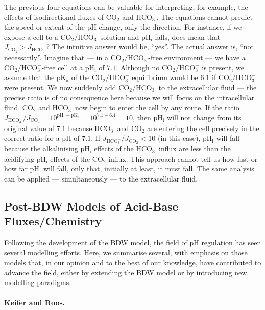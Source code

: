 \documentclass[fleqn,10pt]{physiome}
\begin{document}
The previous four equations can be valuable for interpreting, for example, the effects of isodirectional fluxes of $\mathrm{CO_2}$ and $\mathrm{HCO_3^-}$. The equations cannot predict the speed or extent of the $\mathrm{pH}$ change, only the direction. For instance, if we expose a cell to a $\mathrm{CO_2}/\mathrm{HCO_3^-}$ solution and $\mathrm{pH_i}$ falls, does mean that $J_\mathrm{CO_2}>J_\mathrm{HCO_3^-}$? The intuitive answer would be, ``yes''. The actual answer is, ``not necessarily''. Imagine that --- in a $\mathrm{CO_2}/\mathrm{HCO_3^-}$-free environment --- we have a $\mathrm{CO_2}/\mathrm{HCO_3^-}$-free cell at a $\mathrm{pH_i}$ of $7.1$. Although no $\mathrm{CO_2}/\mathrm{HCO_3^-}$ is present, we assume that the $\mathrm{pK_a}$ of the $\mathrm{CO_2}/\mathrm{HCO_3^-}$ equilibrium would be $6.1$ if $\mathrm{CO_2}/\mathrm{HCO_3^-}$ were present. We now suddenly add $\mathrm{CO_2}/\mathrm{HCO_3^-}$ to the extracellular fluid --- the precise ratio is of no consequence here because we will focus on the intracellular fluid. $\mathrm{CO_2}$ and $\mathrm{HCO_3^-}$ now begin to enter the cell by any route. If the ratio $J_\mathrm{HCO_3^-}/J_\mathrm{CO_2}= 10^{\mathrm{pH_i}-\mathrm{pK_a}} = 10^{7.1-6.1} = 10$, then $\mathrm{pH_i}$  will not change from its original value of $7.1$ because $\mathrm{HCO_3^-}$ and $\mathrm{CO_2}$ are entering the cell precisely in the correct ratio for a $\mathrm{pH}$ of $7.1$. If $J_\mathrm{HCO_3^-}/J_\mathrm{CO_2}<10$ (in this case), $\mathrm{pH_i}$ will fall because the alkalinising $\mathrm{pH_i}$ effects of the $\mathrm{HCO_3^-}$ influx are less than the acidifying $\mathrm{pH_i}$ effects of the $\mathrm{CO_2}$ influx. This approach cannot tell us how fast or how far $\mathrm{pH_i}$ will fall, only that, initially at least, it must fall. The same analysis can be applied --- simultaneously --- to the extracellular fluid.

\subsection{Post-BDW Models of Acid-Base Fluxes/Chemistry}

Following the development of the BDW model, the field of $\mathrm{pH}$ regulation has seen several modelling efforts. Here, we summarise several, with emphasis on those models that, in our opinion and to the best of our knowledge, have contributed to advance the field, either by extending the BDW model or by introducing new modelling paradigms.

\paragraph{Keifer and Roos.}
\end{document}
